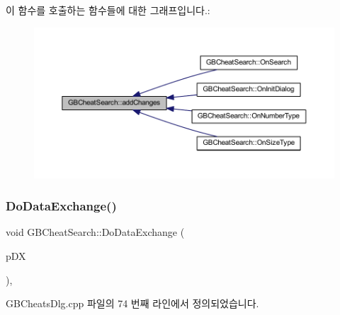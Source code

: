 이 함수를 호출하는 함수들에 대한 그래프입니다.\+:
\nopagebreak
\begin{figure}[H]
\begin{center}
\leavevmode
\includegraphics[width=350pt]{class_g_b_cheat_search_a10b0314fc3b27cda2e217539c9c1e052_icgraph}
\end{center}
\end{figure}
\mbox{\label{class_g_b_cheat_search_ab867411287037dfaee49451bb149d5ad}} 
\subsubsection{\texorpdfstring{Do\+Data\+Exchange()}{DoDataExchange()}}
{\footnotesize\ttfamily void G\+B\+Cheat\+Search\+::\+Do\+Data\+Exchange (\begin{DoxyParamCaption}\item[{C\+Data\+Exchange $\ast$}]{p\+DX }\end{DoxyParamCaption})\hspace{0.3cm}{\ttfamily [protected]}, {\ttfamily [virtual]}}



G\+B\+Cheats\+Dlg.\+cpp 파일의 74 번째 라인에서 정의되었습니다.


